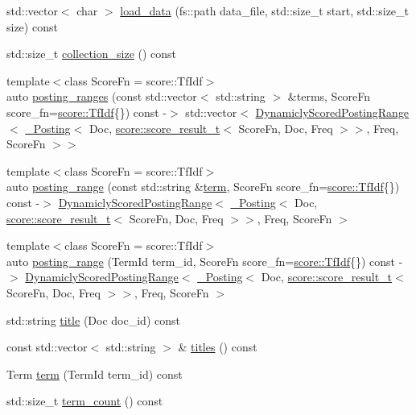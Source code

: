 \begin{DoxyCompactItemize}
\item 
std\+::vector$<$ char $>$ \hyperlink{classirkit_1_1Index_a2dfd40f97f0022b075c8aaa38d96edc7}{load\+\_\+data} (fs\+::path data\+\_\+file, std\+::size\+\_\+t start, std\+::size\+\_\+t size) const
\item 
std\+::size\+\_\+t \hyperlink{classirkit_1_1Index_a45ede4e9e43c8a813d13467d97c084a1}{collection\+\_\+size} () const
\item 
{\footnotesize template$<$class Score\+Fn  = score\+::\+Tf\+Idf$>$ }\\auto \hyperlink{classirkit_1_1Index_ada30daf417b2dc957840170d90dba798}{posting\+\_\+ranges} (const std\+::vector$<$ std\+::string $>$ \&terms, Score\+Fn score\+\_\+fn=\hyperlink{structirkit_1_1score_1_1TfIdf}{score\+::\+Tf\+Idf}\{\}) const -\/$>$ std\+::vector$<$ \hyperlink{classirkit_1_1DynamiclyScoredPostingRange}{Dynamicly\+Scored\+Posting\+Range}$<$ \hyperlink{structirkit_1_1__Posting}{\+\_\+\+Posting}$<$ Doc, \hyperlink{namespaceirkit_1_1score_ab6226695d6d5c54c84fcf2cb8e90c8b3}{score\+::score\+\_\+result\+\_\+t}$<$ Score\+Fn, Doc, Freq $>$$>$, Freq, Score\+Fn $>$$>$
\item 
{\footnotesize template$<$class Score\+Fn  = score\+::\+Tf\+Idf$>$ }\\auto \hyperlink{classirkit_1_1Index_a931de856b06aac7957f7182048e8e852}{posting\+\_\+range} (const std\+::string \&\hyperlink{classirkit_1_1Index_a62050b0a8c8556262b82a45be1ae0262}{term}, Score\+Fn score\+\_\+fn=\hyperlink{structirkit_1_1score_1_1TfIdf}{score\+::\+Tf\+Idf}\{\}) const -\/$>$ \hyperlink{classirkit_1_1DynamiclyScoredPostingRange}{Dynamicly\+Scored\+Posting\+Range}$<$ \hyperlink{structirkit_1_1__Posting}{\+\_\+\+Posting}$<$ Doc, \hyperlink{namespaceirkit_1_1score_ab6226695d6d5c54c84fcf2cb8e90c8b3}{score\+::score\+\_\+result\+\_\+t}$<$ Score\+Fn, Doc, Freq $>$$>$, Freq, Score\+Fn $>$
\item 
{\footnotesize template$<$class Score\+Fn  = score\+::\+Tf\+Idf$>$ }\\auto \hyperlink{classirkit_1_1Index_abeb1c1b2ddc660e42c5c6dad0bab4dc4}{posting\+\_\+range} (Term\+Id term\+\_\+id, Score\+Fn score\+\_\+fn=\hyperlink{structirkit_1_1score_1_1TfIdf}{score\+::\+Tf\+Idf}\{\}) const -\/$>$ \hyperlink{classirkit_1_1DynamiclyScoredPostingRange}{Dynamicly\+Scored\+Posting\+Range}$<$ \hyperlink{structirkit_1_1__Posting}{\+\_\+\+Posting}$<$ Doc, \hyperlink{namespaceirkit_1_1score_ab6226695d6d5c54c84fcf2cb8e90c8b3}{score\+::score\+\_\+result\+\_\+t}$<$ Score\+Fn, Doc, Freq $>$$>$, Freq, Score\+Fn $>$
\item 
std\+::string \hyperlink{classirkit_1_1Index_a6a4d5f7860e2359b89270d20302e6f0b}{title} (Doc doc\+\_\+id) const
\item 
const std\+::vector$<$ std\+::string $>$ \& \hyperlink{classirkit_1_1Index_a632caff9525484c5d453d016c5cb586e}{titles} () const
\item 
Term \hyperlink{classirkit_1_1Index_a62050b0a8c8556262b82a45be1ae0262}{term} (Term\+Id term\+\_\+id) const
\item 
std\+::size\+\_\+t \hyperlink{classirkit_1_1Index_a3051984667589401814296f54e72e32c}{term\+\_\+count} () const
\end{DoxyCompactItemize}


